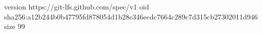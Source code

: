 version https://git-lfs.github.com/spec/v1
oid sha256:a12b244b0b47795fd878054d1b28c346ecdc7664c289c7d315cb27302011d946
size 99
